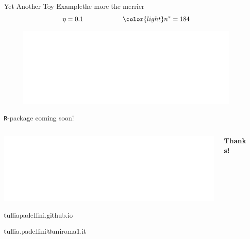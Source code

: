 \documentclass[9 pt]{beamer}
\begin{document}
\begin{frame}{Yet Another Toy Example}{the more the merrier}
\[\eta = 0.1 \qquad\qquad\qquad {\color{light}n^*} = 184\]
\begin{figure}
    \centering
    \includegraphics<1>[width = 1\textwidth]{images/plot_PEC32.pdf}
\end{figure}
    
\end{frame}


\begin{frame}

\vspace{1cm}

\Large{\textcolor{light}{\faArchive} \qquad\texttt{R}-package coming soon!}


\sffamily

\vspace{2cm}

\begin{columns}

\begin{column}{0.45\textwidth}

\includegraphics[width=.7\textwidth]{sapienza-logo-png-6.png}

\vspace{2cm}
{\small 
\textcolor{light}{\faLaptop} \; tulliapadellini.github.io     

\textcolor{light}{\faEnvelope} \; tullia.padellini@uniroma1.it
}


\end{column}

\begin{column}{0.45\textwidth}

\hfill \huge{\color{white} \bf Thanks!}

\vspace{0.25cm}



\vspace{1.25cm}
\vspace{0.3cm}

\small{\hfill } 



\vspace{0.7cm}
\vfill
\hfill 
\end{column}

\end{columns}

\end{frame}
\end{document}
